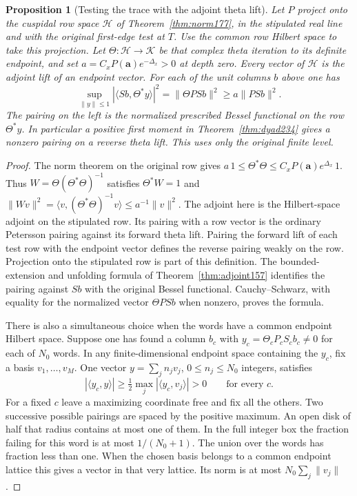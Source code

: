 \documentclass[a4paper,11pt]{article}
\newtheorem{proposition}{Proposition}[section]
\theoremstyle{definition}
\theoremstyle{remark}
\numberwithin{equation}{section}
\begin{document}
\begin{proposition}[Testing the trace with the adjoint theta lift]
\label{prop:adjtheta234}
Let \(P\) project onto the cuspidal row space \(\mathcal H\) of
Theorem~\ref{thm:norm177}, in the stipulated real
line and with the original first-edge test at \(T\). Use the common
row Hilbert space to take this projection. Let
\(\Theta:\mathcal H\to\mathcal K\) be that complex theta iteration
to its definite endpoint, and set
\(a=C_xP(\mathbf a)e^{-\Delta_x}>0\) at depth zero.
Every vector of \(\mathcal H\) is the adjoint lift of an endpoint
vector. For each of the unit columns \(b\) above one has
\[
  \sup_{\|y\|\le1}|\langle Sb,\Theta^* y\rangle|^2
         =\|\Theta P S b\|^2\ge a\|P S b\|^2 .
\]
The pairing on the left is the normalized prescribed Bessel
functional on the row \(\Theta^*y\). In particular a positive
first moment in Theorem~\ref{thm:dyad234} gives a nonzero pairing
on a reverse theta lift. This uses only the original finite level.
\end{proposition}
\begin{proof}
The norm theorem on the original row gives
\(a\,1\le\Theta^*\Theta\le C_xP(\mathbf a)e^{\Delta_x}\,1\).
Thus \(W=\Theta(\Theta^*\Theta)^{-1}\) satisfies
\(\Theta^*W=1\) and
\(\|Wv\|^2=\langle v,(\Theta^*\Theta)^{-1}v\rangle
\le a^{-1}\|v\|^2\). The adjoint here is the Hilbert-space
adjoint on the stipulated row. Its pairing with a row vector
is the ordinary Petersson pairing against its forward theta
lift. Pairing the forward lift of each test row with the endpoint
vector defines the reverse pairing weakly on the row.
Projection onto the stipulated row is part of this definition.
The bounded-extension and unfolding formula of
Theorem~\ref{thm:adjoint157} identifies the pairing against
\(Sb\) with the original Bessel functional. Cauchy--Schwarz,
with equality for the normalized vector \(\Theta P S b\) when
nonzero, proves the formula.

There is also a simultaneous choice when the words have a common
endpoint Hilbert space. Suppose one has found a column \(b_c\)
with \(y_c=\Theta_c P_c S_c b_c\ne0\) for each of \(N_0\) words.
In any finite-dimensional endpoint space containing the \(y_c\),
fix a basis \(v_1,\ldots,v_M\). One vector \(y=\sum_j n_jv_j\),
\(0\le n_j\le N_0\) integers, satisfies
\[
    |\langle y_c,y\rangle|\ge
                \tfrac12\max_j|\langle y_c,v_j\rangle|>0
                          \qquad\text{for every }c .
\]
For a fixed \(c\) leave a maximizing coordinate free and fix all
the others. Two successive possible pairings are spaced by
the positive maximum. An open disk of half that radius contains
at most one of them. In the full integer box the fraction failing
for this word is at most \(1/(N_0+1)\). The union over the words
has fraction less than one. When the chosen basis belongs to a
common endpoint lattice this gives a vector in that very lattice.
Its norm is at most \(N_0\sum_j\|v_j\|\).
\end{proof}
\end{document}
